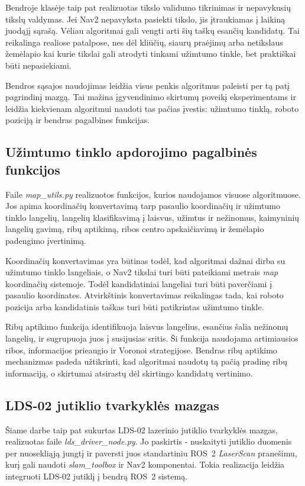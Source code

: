 \documentclass[]{VUMIFTemplateClass}
\begin{document}
Bendroje klasėje taip pat realizuotas tikslo validumo tikrinimas ir nepavykusių tikslų valdymas. Jei Nav2 nepavyksta pasiekti tikslo, jis įtraukiamas į
laikiną juodąjį sąrašą. Vėliau algoritmai gali vengti arti šių taškų esančių kandidatų. Tai reikalinga realiose patalpose, nes dėl kliūčių, siaurų praėjimų
arba netikslaus žemėlapio kai kurie tikslai gali atrodyti tinkami užimtumo tinkle, bet praktiškai būti nepasiekiami.

Bendros sąsajos naudojimas leidžia visus penkis algoritmus paleisti per tą patį pagrindinį mazgą. Tai mažina įgyvendinimo skirtumų poveikį eksperimentams ir
leidžia kiekvienam algoritmui naudoti tas pačias įvestis: užimtumo tinklą, roboto poziciją ir bendras pagalbines funkcijas.

\subsection{Užimtumo tinklo apdorojimo pagalbinės funkcijos}

Faile \textit{map\_utils.py} realizuotos funkcijos, kurios naudojamos visuose algoritmuose. Jos apima koordinačių konvertavimą tarp pasaulio koordinačių ir
užimtumo tinklo langelių, langelių klasifikavimą į laisvus, užimtus ir nežinomus, kaimyninių langelių gavimą, ribų aptikimą, ribos centro apskaičiavimą ir
žemėlapio padengimo įvertinimą.

Koordinačių konvertavimas yra būtinas todėl, kad algoritmai dažnai dirba su užimtumo tinklo langeliais, o Nav2 tikslai turi būti pateikiami metrais
\textit{map} koordinačių sistemoje. Todėl kandidatiniai langeliai turi būti paverčiami į pasaulio koordinates. Atvirkštinis konvertavimas reikalingas tada,
kai roboto pozicija arba kandidatinis taškas turi būti patikrintas užimtumo tinkle.

Ribų aptikimo funkcija identifikuoja laisvus langelius, esančius šalia nežinomų langelių, ir sugrupuoja juos į susijusias sritis. Ši funkcija naudojama
artimiausios ribos, informacijos prieaugio ir Voronoi strategijose. Bendras ribų aptikimo mechanizmas padeda užtikrinti, kad algoritmai naudotų tą pačią
pradinę ribų informaciją, o skirtumai atsirastų dėl skirtingo kandidatų vertinimo.

\subsection{LDS-02 jutiklio tvarkyklės mazgas}

Šiame darbe taip pat sukurtas LDS-02 lazerinio jutiklio tvarkyklės mazgas, realizuotas faile \textit{lds\_driver\_node.py}. Jo paskirtis - nuskaityti jutiklio
duomenis per nuosekliąją jungtį ir paversti juos standartiniu ROS~2 \textit{LaserScan} pranešimu, kurį gali naudoti \textit{slam\_toolbox} ir Nav2
komponentai. Tokia realizacija leidžia integruoti LDS-02 jutiklį į bendrą ROS~2 sistemą.
\end{document}
